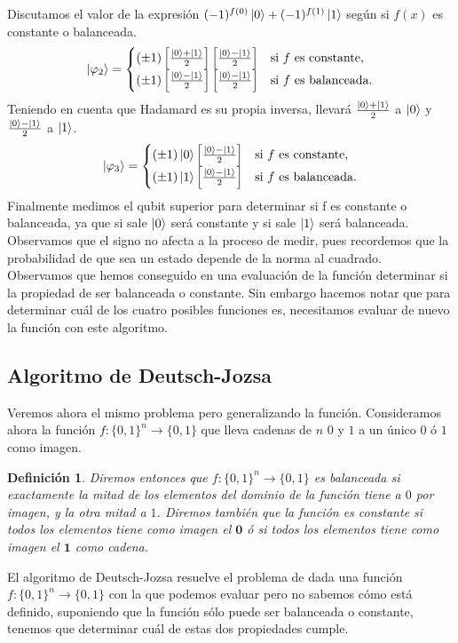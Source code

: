 \documentclass[a4paper]{article}
\newtheorem{deff}{Definición}[section]
\numberwithin{equation}{section}
\begin{document}
Discutamos el valor de la expresión $(-1)^{f(0)} \ket{0} + (-1)^{f(1)} \ket{1}$ según si $f(x)$ es constante o balanceada.
\begin{equation}
\ket{\varphi_2} = 
\begin{cases}
(\pm 1) \left[\frac{\ket{0}+\ket{1}}{2}\right] \left[\frac{\ket{0}-\ket{1}}{2}\right] & \textrm{si } f \textrm{ es constante,} \\
(\pm 1) \left[\frac{\ket{0}-\ket{1}}{2}\right] \left[\frac{\ket{0}-\ket{1}}{2}\right] & \textrm{si } f \textrm{ es balanceada.}
\end{cases}
\end{equation}
Teniendo en cuenta que Hadamard es su propia inversa, llevará $\frac{\ket{0}+\ket{1}}{2}$ a $\ket{0}$ y $\frac{\ket{0}-\ket{1}}{2}$ a $\ket{1}$.
\begin{equation}
\ket{\varphi_3} = 
\begin{cases}
(\pm 1) \ket{0} \left[\frac{\ket{0}-\ket{1}}{2}\right] & \textrm{si } f \textrm{ es constante,} \\
(\pm 1) \ket{1} \left[\frac{\ket{0}-\ket{1}}{2}\right] & \textrm{si } f \textrm{ es balanceada.}
\end{cases}
\end{equation}
Finalmente medimos el qubit superior para determinar si f es constante o balanceada, ya que si sale $\ket{0}$ será constante y si sale $\ket{1}$ será balanceada. Observamos que el signo no afecta a la proceso de medir, pues recordemos que la probabilidad de que sea un estado depende de la norma al cuadrado.\\
Observamos que hemos conseguido en una evaluación de la función determinar si la propiedad de ser balanceada o constante. Sin embargo hacemos notar que para determinar cuál de los cuatro posibles funciones es, necesitamos evaluar de nuevo la función con este algoritmo.

\newpage

\subsection{Algoritmo de Deutsch-Jozsa}
Veremos ahora el mismo problema pero generalizando la función. Consideramos ahora la función $f:\{0, 1\}^n \longrightarrow \{0, 1\}$ que lleva cadenas de $n$ $0$ y $1$ a un único $0$ ó $1$ como imagen.\\
\begin{deff}
Diremos entonces que $f:\{0, 1\}^n \longrightarrow \{0, 1\}$ es balanceada si exactamente la mitad de los elementos del dominio de la función tiene a $0$ por imagen, y la otra mitad a $1$. Diremos también que la función es constante si todos los elementos tiene como imagen el $\mathbf{0}$ ó si todos los elementos tiene como imagen el $\mathbf{1}$ como cadena.
\end{deff}
El algoritmo de Deutsch-Jozsa resuelve el problema de dada una función $f:\{0, 1\}^n \longrightarrow \{0, 1\}$ con la que podemos evaluar pero no sabemos cómo está definido, suponiendo que la función sólo puede ser balanceada o constante, tenemos que determinar cuál de estas dos propiedades cumple.\\
\end{document}
